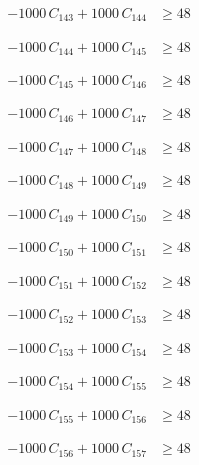 \documentclass[a4paper,11pt]{article}
\begin{document}
\begin{align}
-1000\,C_{143} + 1000\,C_{144} &\geq 48 \nonumber
\end{align}

\begin{align}
-1000\,C_{144} + 1000\,C_{145} &\geq 48 \nonumber
\end{align}

\begin{align}
-1000\,C_{145} + 1000\,C_{146} &\geq 48 \nonumber
\end{align}

\begin{align}
-1000\,C_{146} + 1000\,C_{147} &\geq 48 \nonumber
\end{align}

\begin{align}
-1000\,C_{147} + 1000\,C_{148} &\geq 48 \nonumber
\end{align}

\begin{align}
-1000\,C_{148} + 1000\,C_{149} &\geq 48 \nonumber
\end{align}

\begin{align}
-1000\,C_{149} + 1000\,C_{150} &\geq 48 \nonumber
\end{align}

\begin{align}
-1000\,C_{150} + 1000\,C_{151} &\geq 48 \nonumber
\end{align}

\begin{align}
-1000\,C_{151} + 1000\,C_{152} &\geq 48 \nonumber
\end{align}

\begin{align}
-1000\,C_{152} + 1000\,C_{153} &\geq 48 \nonumber
\end{align}

\begin{align}
-1000\,C_{153} + 1000\,C_{154} &\geq 48 \nonumber
\end{align}

\begin{align}
-1000\,C_{154} + 1000\,C_{155} &\geq 48 \nonumber
\end{align}

\begin{align}
-1000\,C_{155} + 1000\,C_{156} &\geq 48 \nonumber
\end{align}

\begin{align}
-1000\,C_{156} + 1000\,C_{157} &\geq 48 \nonumber
\end{align}
\end{document}
